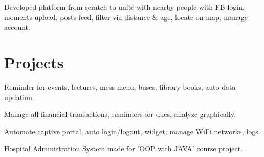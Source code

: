\documentclass[letterpaper]{deedy-resume} %
\begin{document}
\begin{minipage}[t]{0.66\textwidth}
Developed platform from scratch to unite with nearby people with FB login, moments upload, posts feed, filter via distance \& age, locate on map, manage account.

\sectionspace %


\section{Projects}


Reminder for events, lectures, mess menu, buses, library books, auto data updation.

\sectionspace %


Manage all financial transactions, reminders for dues, analyze graphically.

\sectionspace %


Automate captive portal, auto login/logout, widget, manage WiFi networks, logs.

\sectionspace %


Hospital Administration System made for ’OOP with JAVA’ course project.

\sectionspace %


\end{minipage}
\end{document}
